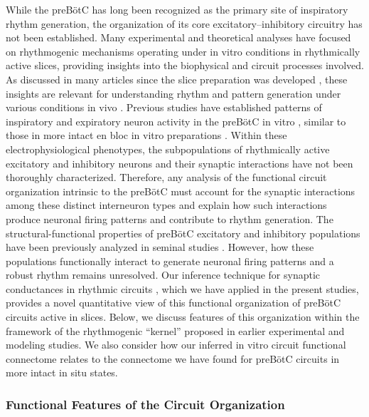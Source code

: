 \documentclass[
]{article}
\begin{document}
While the preBötC has long been recognized as the primary site of inspiratory rhythm generation, the organization of its core excitatory--inhibitory circuitry has not been established. Many experimental and theoretical analyses have focused on rhythmogenic mechanisms operating under in vitro conditions in rhythmically active slices, providing insights into the biophysical and circuit processes involved. As discussed in many articles since the slice preparation was developed \citep{smith1991prebotzinger}, these insights are relevant for understanding rhythm and pattern generation under various conditions in vivo \citep[e.g.,][]{smith2000respiratory,feldman2006looking,smith2007spatial,richter2014respiratory,phillips2019biophysical}. Previous studies have established patterns of inspiratory and expiratory neuron activity in the preBötC in vitro \citep[e.g.,][]{johnson1994pacemaker,shao1997respiratory}, similar to those in more intact en bloc in vitro preparations \citep{smith1990neural}. Within these electrophysiological phenotypes, the subpopulations of rhythmically active excitatory and inhibitory neurons \citep[e.g.,][]{kuwana2006electrophysiological,winter2009glycinergic,morgadovalle2010glycinergic,koizumi2013structural,ausborn2018organization} and their synaptic interactions have not been thoroughly characterized. Therefore, any analysis of the functional circuit organization intrinsic to the preBötC must account for the synaptic interactions among these distinct interneuron types and explain how such interactions produce neuronal firing patterns and contribute to rhythm generation. The structural-functional properties of preBötC excitatory and inhibitory populations have been previously analyzed in seminal studies \citep{koizumi2013structural}. However, how these populations functionally interact to generate neuronal firing patterns and a robust rhythm remains unresolved. Our inference technique for synaptic conductances in rhythmic circuits \citep{molkov2024inference}, which we have applied in the present studies, provides a novel quantitative view of this functional organization of preBötC circuits active in slices. Below, we discuss features of this organization within the framework of the rhythmogenic ``kernel'' proposed in earlier experimental and modeling studies. We also consider how our inferred in vitro circuit functional connectome relates to the connectome we have found for preBötC circuits in more intact in situ states.

\subsubsection{Functional Features of the Circuit Organization}
\end{document}
